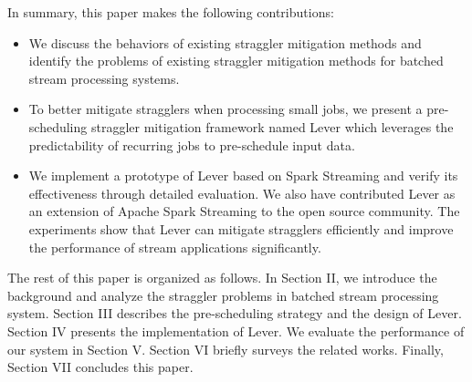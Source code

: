   In summary, this paper makes the following contributions:
\begin{itemize}
  \item We discuss the behaviors of existing straggler mitigation methods and identify the problems of existing straggler mitigation methods for batched stream processing systems.

  \item To better mitigate stragglers when processing small jobs, we present a pre-scheduling straggler mitigation framework named Lever which leverages the predictability of recurring jobs to pre-schedule input data.

  \item We implement a prototype of Lever based on Spark Streaming and verify its effectiveness through detailed evaluation. We also have contributed Lever as an extension of Apache Spark Streaming to the open source community. The experiments show that Lever can mitigate stragglers efficiently and improve the performance of stream applications significantly.
\end{itemize}

  The rest of this paper is organized as follows. In Section II, we introduce the background and analyze the straggler problems in batched stream processing system. Section III describes the pre-scheduling strategy and the design of Lever. Section IV presents the implementation of Lever. We evaluate the performance of our system in Section V. Section VI briefly surveys the related works. Finally, Section VII concludes this paper.